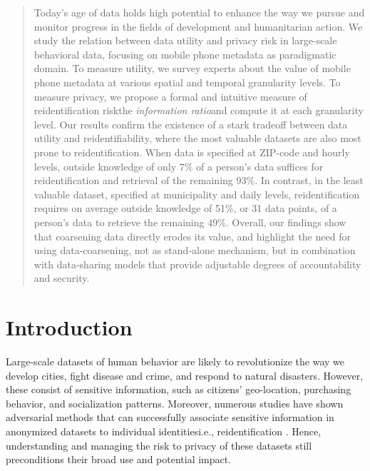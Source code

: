 \documentclass[12pt]{article}
\newenvironment{sciabstract}{ 
	\begin{quote} \bf }
	{\end{quote}}
\begin{document}


\begin{sciabstract}    %
	\label{abstract}

Today's age of data holds high potential to enhance the way we pursue and monitor progress in the fields of development and humanitarian action. We study the relation between data utility and privacy risk in large-scale behavioral data, focusing on mobile phone metadata as paradigmatic domain. To measure utility, we survey experts about the value of mobile phone metadata at various spatial and temporal granularity levels. To measure privacy, we propose a formal and intuitive measure of reidentification risk\iffalse in high-dimensional data\fi\textemdash the \textit{information ratio}\textemdash and compute it at each granularity level. 
Our results confirm the existence of a stark tradeoff between data utility and reidentifiability, where the most valuable datasets are also most prone to reidentification. When data is specified at ZIP-code and hourly levels, outside knowledge of only 7\% of a person's data suffices for reidentification and retrieval of the remaining 93\%. In contrast, in the least valuable dataset, specified at municipality and daily levels, reidentification requires on average outside knowledge of 51\%, or 31 data points, of a person's data to retrieve the remaining 49\%. \iffalse However, we also find that the tradeoff is not strict: we identify Pareto-suboptimal granularity levels that substantially increase reidentifiability, yet without gains in data usefulness.\fi Overall, our findings show that coarsening data directly erodes its value, and highlight the need for using data-coarsening, not as stand-alone mechanism, but in combination with data-sharing models that provide adjustable degrees of accountability and security.
\end{sciabstract}





\tableofcontents

\pagebreak
\section{Introduction}

Large-scale datasets of human behavior are likely to revolutionize the way we develop cities, fight disease and crime, and respond to natural disasters. However, these consist of sensitive information, such as citizens' geo-location, purchasing behavior, and socialization patterns. Moreover, numerous studies have shown adversarial methods that can successfully associate sensitive information in anonymized datasets to individual identities\textemdash i.e., reidentification \cite{de2013unique,gramaglia2014anonymizability,song2014not,de2015unique, cecaj2016re, boutet2016uniqueness, narayanan2008robust, el2011systematic, wondracek2010practical}. Hence, understanding and managing the risk to privacy of these datasets still preconditions their broad use and potential impact.
\end{document}
